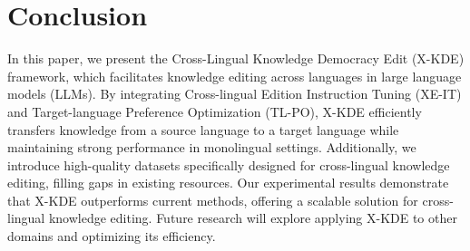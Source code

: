 \section{Conclusion}
\label{sec:conclusion}

In this paper, we present the Cross-Lingual Knowledge Democracy Edit (X-KDE) framework, which facilitates knowledge editing across languages in large language models (LLMs). By integrating Cross-lingual Edition Instruction Tuning (XE-IT) and Target-language Preference Optimization (TL-PO), X-KDE efficiently transfers knowledge from a source language to a target language while maintaining strong performance in monolingual settings. Additionally, we introduce high-quality datasets specifically designed for cross-lingual knowledge editing, filling gaps in existing resources. Our experimental results demonstrate that X-KDE outperforms current methods, offering a scalable solution for cross-lingual knowledge editing. Future research will explore applying X-KDE to other domains and optimizing its efficiency.

